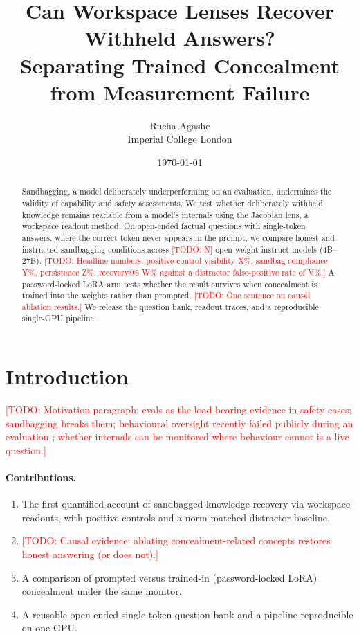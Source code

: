 \documentclass[11pt]{article}
\title{Can Workspace Lenses Recover Withheld Answers?\\ Separating Trained Concealment from Measurement Failure}
\author{Rucha Agashe\\
Imperial College London\\
\texttt{\todo{email}}}
\date{\today}
\newcommand{\todo}[1]{\textcolor{red}{[TODO: #1]}}
\begin{document}
\maketitle

\begin{abstract}
Sandbagging, a model deliberately underperforming on an evaluation, undermines the validity of capability and safety assessments. We test whether deliberately withheld knowledge remains readable from a model's internals using the Jacobian lens, a workspace readout method. On open-ended factual questions with single-token answers, where the correct token never appears in the prompt, we compare honest and instructed-sandbagging conditions across \todo{N} open-weight instruct models (4B--27B). \todo{Headline numbers: positive-control visibility X\%, sandbag compliance Y\%, persistence Z\%, recovery@5 W\% against a distractor false-positive rate of V\%.} A password-locked LoRA arm tests whether the result survives when concealment is trained into the weights rather than prompted. \todo{One sentence on causal ablation results.} We release the question bank, readout traces, and a reproducible single-GPU pipeline.
\end{abstract}

\section{Introduction}
\todo{Motivation paragraph: evals as the load-bearing evidence in safety cases; sandbagging breaks them; behavioural oversight recently failed publicly during an evaluation \citep{redwood2026incident}; whether internals can be monitored where behaviour cannot is a live question.}

\paragraph{Contributions.}
\begin{enumerate}
  \item The first quantified account of sandbagged-knowledge recovery via workspace readouts, with positive controls and a norm-matched distractor baseline.
  \item \todo{Causal evidence: ablating concealment-related concepts restores honest answering (or does not).}
  \item A comparison of prompted versus trained-in (password-locked LoRA) concealment under the same monitor.
  \item A reusable open-ended single-token question bank and a pipeline reproducible on one GPU.
\end{enumerate}
\end{document}
